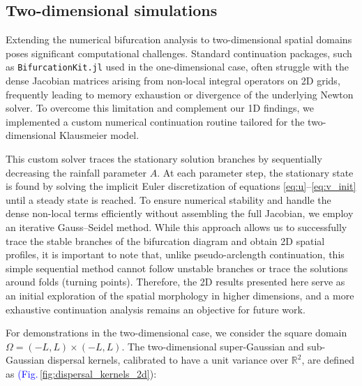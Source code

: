 \documentclass[11pt, a4paper]{article}
\theoremstyle{break}
\theoremstyle{break}
\theoremstyle{break}
\theoremstyle{break}
\theoremstyle{break}
\theoremstyle{break}
\theoremstyle{break}
\theoremstyle{break}
\theoremstyle{break}
\theoremstyle{break}
\begin{document}
\subsection{Two-dimensional simulations}

Extending the numerical bifurcation analysis to two-dimensional spatial domains poses significant computational challenges. Standard continuation packages, such as \texttt{BifurcationKit.jl} used in the one-dimensional case, often struggle with the dense Jacobian matrices arising from non-local integral operators on 2D grids, frequently leading to memory exhaustion or divergence of the underlying Newton solver. To overcome this limitation and complement our 1D findings, we implemented a custom numerical continuation routine tailored for the two-dimensional Klausmeier model.

This custom solver traces the stationary solution branches by sequentially decreasing the rainfall parameter $A$. At each parameter step, the stationary state is found by solving the implicit Euler discretization of equations \eqref{eq:u}--\eqref{eq:v_init} until a steady state is reached. To ensure numerical stability and handle the dense non-local terms efficiently without assembling the full Jacobian, we employ an iterative Gauss--Seidel method. While this approach allows us to successfully trace the stable branches of the bifurcation diagram and obtain 2D spatial profiles, it is important to note that, unlike pseudo-arclength continuation, this simple sequential method cannot follow unstable branches or trace the solutions around folds (turning points). Therefore, the 2D results presented here serve as an initial exploration of the spatial morphology in higher dimensions, and a more exhaustive continuation analysis remains an objective for future work.

For demonstrations in the two-dimensional case, we consider the square domain $\Omega = (-L, L) \times (-L, L)$. The two-dimensional super-Gaussian and sub-Gaussian dispersal kernels, calibrated to have a unit variance over $\mathbb{R}^2$, are defined as \textcolor{blue}{(Fig.\,\ref{fig:dispersal_kernels_2d}}):
\end{document}
